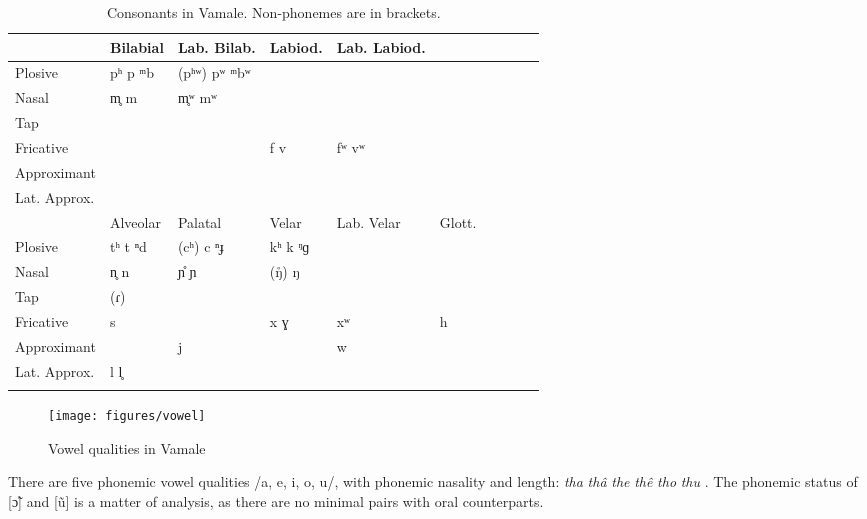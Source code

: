 
\begin{table}
\caption{Consonants in Vamale. Non-phonemes are in brackets.}
\begin{tabular}{llllllllll}
\lsptoprule
                   & Bilabial & Lab. Bilab. & Labiod. & Lab. Labiod. \\\midrule
Plosive            & pʰ p ᵐb & (pʰʷ) pʷ ᵐbʷ &           &              \\
Nasal              & m̥ m     & m̥ʷ mʷ        &           &            \\
Tap                &         &              &           &              \\
Fricative          &         &              & f v       & fʷ vʷ        \\
Approximant        &         &              &           &              \\
Lat. Approx.       &         &              &           &              \\\midrule
                   & Alveolar & Palatal & Velar & Lab. Velar & Glott. \\\midrule
Plosive            & tʰ t ⁿd & (cʰ) c ⁿɟ & kʰ k ᵑɡ &    &  \\
Nasal              & n̥ n     & ɲ̊ ɲ       & (ŋ̊) ŋ   &    &  \\
Tap                & (ɾ)     &           &         &    &  \\ %
Fricative          & s       &           & x ɣ     & xʷ & h \\
Approximant        &         & j         &         & w  &  \\
Lat. Approx.       & l l̥     &           &         &    &\\
\lspbottomrule
\end{tabular}
\label{tab:intro_cons}
\end{table}

\begin{figure}
	\texttt{[image: figures/vowel]}
	\caption{Vowel qualities in Vamale}
	\label{fig:intro_vowel}
\end{figure}


There are five phonemic vowel qualities /a, e, i, o, u/, with phonemic nasality and length: \textit{tha}  \textit{thâ}  \textit{the}  \textit{thê}  \textit{tho}  \textit{thu} . The phonemic status of [ɔ̃] and [ũ] is a matter of analysis, as there are no minimal pairs with oral counterparts.

